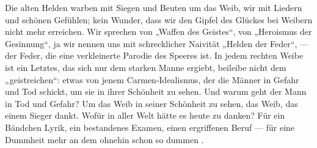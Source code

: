 Die alten Helden warben mit Siegen und Beuten um das Weib, wir mit Liedern und schönen Gefühlen; kein Wunder, dass wir den Gipfel des Glückes bei Weibern nicht mehr erreichen. Wir sprechen von „Waffen des Geistes“, von „Heroismus der Gesinnung“, ja wir nennen uns mit schrecklicher Naivität „Helden der Feder“, — der Feder, die eine verkleinerte Parodie des Speeres ist. In jedem rechten Weibe ist ein Letztes, das sich nur dem starken Manne ergiebt, beileibe nicht dem „geistreichen“: etwas von jenem Carmen-Idealismus, der die Männer in Gefahr und Tod schickt, um sie in ihrer Schönheit zu sehen. Und warum geht der Mann in Tod und Gefahr? Um das Weib in seiner Schönheit zu sehen, das Weib, das einem Sieger dankt. Wofür in aller Welt hätte es heute zu danken? Für ein Bändchen Lyrik, ein bestandenes Examen, einen ergriffenen Beruf — für eine Dummheit mehr an dem ohnehin schon so dummen .
\par

